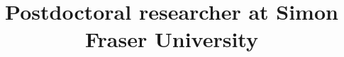 %



\usepackage[T1]{fontenc}
\usepackage{lmodern}
\usepackage{fontawesome}
\usepackage{enumitem}
\usepackage[scale=0.9]{geometry}
\setlength{\hintscolumnwidth}{2.5cm}           %

\title{Postdoctoral researcher at Simon Fraser University}



\def\FormatName#1{%
  \def\myname{Snehasish Kumar}%
    \edef\name{#1}%
  \ifx\name\myname
      \underline{#1}%
    \else
    #1%
  \fi
}

